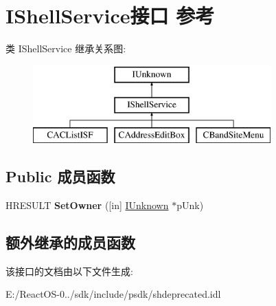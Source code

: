 \hypertarget{interface_i_shell_service}{}\section{I\+Shell\+Service接口 参考}
\label{interface_i_shell_service}
类 I\+Shell\+Service 继承关系图\+:\begin{figure}[H]
\begin{center}
\leavevmode
\includegraphics[height=3.000000cm]{interface_i_shell_service}
\end{center}
\end{figure}
\subsection*{Public 成员函数}
\begin{DoxyCompactItemize}
\item 
\mbox{\label{interface_i_shell_service_a0dd63130868aa77e8daeb2b4d6f9a05b}} 
H\+R\+E\+S\+U\+LT {\bfseries Set\+Owner} (\mbox{[}in\mbox{]} \hyperlink{interface_i_unknown}{I\+Unknown} $\ast$p\+Unk)
\end{DoxyCompactItemize}
\subsection*{额外继承的成员函数}


该接口的文档由以下文件生成\+:\begin{DoxyCompactItemize}
\item 
E\+:/\+React\+O\+S-\/0../sdk/include/psdk/shdeprecated.\+idl\end{DoxyCompactItemize}

